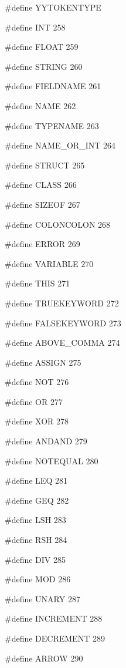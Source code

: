 \medskip
{\stt \#define YYTOKENTYPE}

\medskip
{\stt \#define INT 258}

\medskip
{\stt \#define FLOAT 259}

\medskip
{\stt \#define STRING 260}

\medskip
{\stt \#define FIELDNAME 261}

\medskip
{\stt \#define NAME 262}

\medskip
{\stt \#define TYPENAME 263}

\medskip
{\stt \#define NAME\_OR\_INT 264}

\medskip
{\stt \#define STRUCT 265}

\medskip
{\stt \#define CLASS 266}

\medskip
{\stt \#define SIZEOF 267}

\medskip
{\stt \#define COLONCOLON 268}

\medskip
{\stt \#define ERROR 269}

\medskip
{\stt \#define VARIABLE 270}

\medskip
{\stt \#define THIS 271}

\medskip
{\stt \#define TRUEKEYWORD 272}

\medskip
{\stt \#define FALSEKEYWORD 273}

\medskip
{\stt \#define ABOVE\_COMMA 274}

\medskip
{\stt \#define ASSIGN 275}

\medskip
{\stt \#define NOT 276}

\medskip
{\stt \#define OR 277}

\medskip
{\stt \#define XOR 278}

\medskip
{\stt \#define ANDAND 279}

\medskip
{\stt \#define NOTEQUAL 280}

\medskip
{\stt \#define LEQ 281}

\medskip
{\stt \#define GEQ 282}

\medskip
{\stt \#define LSH 283}

\medskip
{\stt \#define RSH 284}

\medskip
{\stt \#define DIV 285}

\medskip
{\stt \#define MOD 286}

\medskip
{\stt \#define UNARY 287}

\medskip
{\stt \#define INCREMENT 288}

\medskip
{\stt \#define DECREMENT 289}

\medskip
{\stt \#define ARROW 290}

